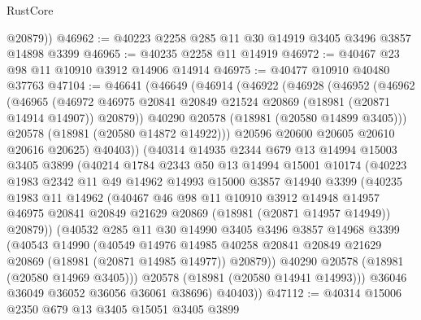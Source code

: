 \begin{lexlean}{RustCore}
\begin{coremodule}
        @20879))
@46962 := @40223 @2258 @285 @11 @30 @14919 @3405 @3496 @3857 @14898 @3399
@46965 := @40235 @2258 @11 @14919
@46972 := @40467 @23 @98 @11 @10910 @3912 @14906 @14914
@46975 := @40477 @10910 @40480 @37763
@47104 := @46641
    (@46649
      (@46914
        (@46922
          (@46928
            (@46952
              (@46962
                (@46965
                  (@46972
                    @46975
                    @20841
                    @20849
                    @21524
                    @20869
                    (@18981 (@20871 @14914 @14907))
                    @20879))
                @40290
                @20578
                (@18981 (@20580 @14899 @3405)))
              @20578
              (@18981 (@20580 @14872 @14922)))
            @20596
            @20600
            @20605
            @20610
            @20616
            @20625)
          @40403))
      (@40314
        @14935
        @2344
        @679
        @13
        @14994
        @15003
        @3405
        @3899
        (@40214
          @1784
          @2343
          @50
          @13
          @14994
          @15001
          @10174
          (@40223
            @1983
            @2342
            @11
            @49
            @14962
            @14993
            @15000
            @3857
            @14940
            @3399
            (@40235
              @1983
              @11
              @14962
              (@40467
                @46
                @98
                @11
                @10910
                @3912
                @14948
                @14957
                @46975
                @20841
                @20849
                @21629
                @20869
                (@18981 (@20871 @14957 @14949))
                @20879))
            (@40532
              @285
              @11
              @30
              @14990
              @3405
              @3496
              @3857
              @14968
              @3399
              (@40543
                @14990
                (@40549
                  @14976
                  @14985
                  @40258
                  @20841
                  @20849
                  @21629
                  @20869
                  (@18981 (@20871 @14985 @14977))
                  @20879))
              @40290
              @20578
              (@18981 (@20580 @14969 @3405)))
            @20578
            (@18981 (@20580 @14941 @14993)))
          @36046
          @36049
          @36052
          @36056
          @36061
          @38696)
        @40403))
@47112 := @40314 @15006 @2350 @679 @13 @3405 @15051 @3405 @3899

\end{coremodule}
\end{lexlean}
